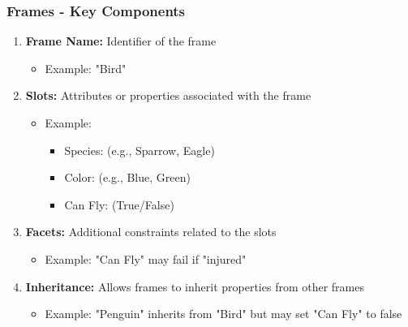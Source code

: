 \documentclass[aspectratio=169]{beamer}
\begin{document}
\begin{frame}[fragile]
    \frametitle{Frames - Key Components}
    \begin{enumerate}
        \item \textbf{Frame Name:} Identifier of the frame
              \begin{itemize}
                  \item Example: "Bird"
              \end{itemize}
        \item \textbf{Slots:} Attributes or properties associated with the frame
              \begin{itemize}
                  \item Example: 
                  \begin{itemize}
                      \item Species: (e.g., Sparrow, Eagle)
                      \item Color: (e.g., Blue, Green)
                      \item Can Fly: (True/False)
                  \end{itemize}
              \end{itemize}
        \item \textbf{Facets:} Additional constraints related to the slots
              \begin{itemize}
                  \item Example: "Can Fly" may fail if "injured"
              \end{itemize}
        \item \textbf{Inheritance:} Allows frames to inherit properties from other frames
              \begin{itemize}
                  \item Example: "Penguin" inherits from "Bird" but may set "Can Fly" to false
              \end{itemize}
    \end{enumerate}
\end{frame}
\end{document}
